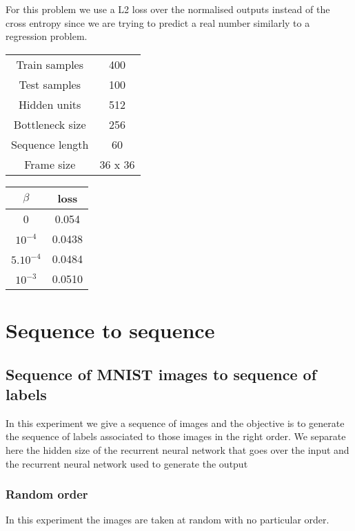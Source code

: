 \documentclass[11pt,oneside,openright]{report}
\begin{document}
For this problem we use a L2 loss over the normalised outputs instead of the cross entropy since we are trying to predict a real number similarly to a regression problem.

\begin{minipage}{0.35\textwidth}
        \centering
\begin{tabular}{ c | c  }
 Train samples & 400 \\
 Test samples & 100 \\
 Hidden units & 512 \\
 Bottleneck size & 256 \\
 Sequence length & 60 \\
 Frame size & 36 x 36
\end{tabular}
    \end{minipage}\hfill
    \begin{minipage}{0.8\textwidth}
        \centering
\begin{tabular}{ c | c }
 $\beta$ &  loss \\
 \hline
0  & 0.054 \\
$10^{-4}$  & 0.0438 \\
$5.10^{-4}$  & 0.0484 \\
$10^{-3}$  & 0.0510 \\
\end{tabular}
    \end{minipage}


\section{Sequence to sequence}
\subsection{Sequence of MNIST images to sequence of labels}
In this experiment we give a sequence of images and the objective is to generate the sequence of labels associated to those images in the right order. We separate here the hidden size of the recurrent neural network that goes over the input and the recurrent neural network used to generate the output

\subsubsection{Random order}
In this experiment the images are taken at random with no particular order.
\end{document}
